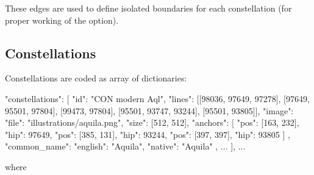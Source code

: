These edges are used to define isolated boundaries for each constellation (for proper working of the  option). 



\subsection{Constellations}
\label{sec:skycultures:constellations}
\label{SC:constellations}

Constellations are coded as array of dictionaries:

\begin{jsonfile}[\scriptsize]
"constellations": [
    {
      "id": "CON modern Aql",
      "lines": [[98036, 97649, 97278], [97649, 95501, 97804], [99473, 97804], 
				[95501, 93747, 93244], [95501, 93805]],
      "image": {
        "file": "illustrations/aquila.png",
        "size": [512, 512],
        "anchors": [
          {"pos": [163, 232], "hip": 97649},
          {"pos": [385, 131], "hip": 93244},
          {"pos": [397, 397], "hip": 93805}
        ]
      },
      "common_name": {"english": "Aquila", "native": "Aquila"}
    }, ... 
], ...
\end{jsonfile}

where

